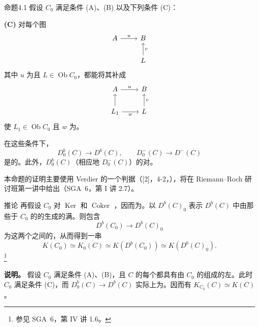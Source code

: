 \begin{SGAresult}{命题}{4.1}
假设 $C_0$ 满足条件 (A)、(B) 以及下列条件 (C)：

\textbf{(C)} 对每个图
\[
\begin{tikzcd}
A\arrow[r,"u"]&B\\
&L\arrow[u,"v"']
\end{tikzcd}
\]
其中 $u$ 为且 $L\in\operatorname{Ob}C_0$，都能将其补成
\[
\begin{tikzcd}
A\arrow[r,"u"]&B\\
L_1\arrow[u]\arrow[r,"w"']&L\arrow[u,"v"']
\end{tikzcd}
\]
使 $L_1\in\operatorname{Ob}C_0$ 且 $w$ 为。

在这些条件下，
\[
D_0^b(C)\longrightarrow D^b(C),\qquad
D_0^-(C)\longrightarrow D^-(C)
\]
是的。此外，$D_0^b(C)$（相应地 $D_0^-(C)$）的对。
\end{SGAresult}

本命题的证明主要使用 Verdier 的一个判据（[2]，4-2，），将在 Riemann--Roch 研讨班第一讲中给出（SGA~6，第 I 讲 2.7）。

\begin{SGAresult}{推论}{}
再假设 $C_0$ 对 $\operatorname{Ker}$ 和 $\operatorname{Coker}$ ，因而为。以 $D^b(C)_0$ 表示 $D^b(C)$ 中由那些于 $C_0$ 的的生成的满。则包含
\[
D^b(C_0)\longrightarrow D^b(C)_0
\]
为这两个之间的，从而得到一串
\[
K(C_0)\simeq K_0(C)\simeq K(D^b(C_0))\simeq K(D^b(C)_0).
\]\footnote{参见 SGA~6，第 IV 讲 1.6。}
\end{SGAresult}

\textbf{说明。} 假设 $C_0$ 满足条件 (A)、(B)，且 $C$ 的每个都具有由 $C_0$ 的组成的左。此时 $C_0$ 满足条件 (C)，而 $D_0^b(C)\to D^b(C)$ 实际上为。因而有 $K_{C_0}(C)\simeq K(C)$。

